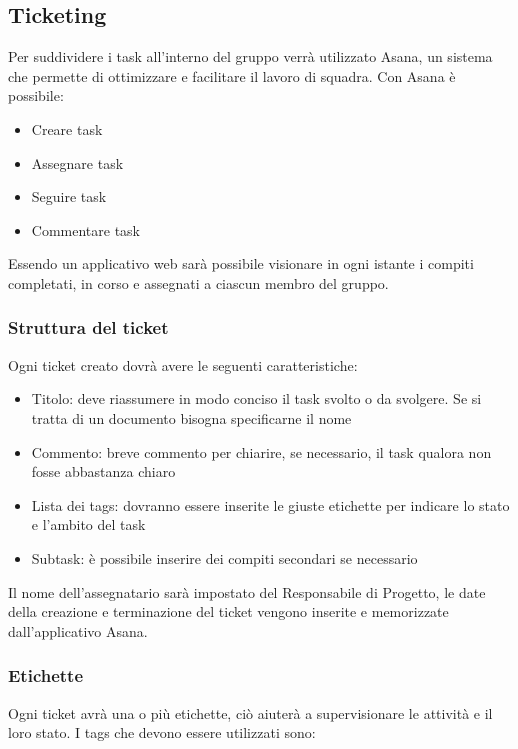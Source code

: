 \subsection{Ticketing}

Per suddividere i task all’interno del gruppo verrà utilizzato Asana, un sistema che permette di ottimizzare e facilitare il lavoro di squadra. Con Asana è possibile:
\begin{itemize}
	\item Creare task
	\item Assegnare task
	\item Seguire task 
	\item Commentare task
\end{itemize}
Essendo un applicativo web sarà possibile visionare in ogni istante i compiti completati, in corso e assegnati a ciascun membro del gruppo.


\subsubsection{Struttura del ticket}
Ogni ticket creato dovrà avere le seguenti caratteristiche:
\begin{itemize}
	\item Titolo: deve riassumere in modo conciso il task svolto o da svolgere. Se si tratta di un documento bisogna specificarne il nome
	\item Commento: breve commento per chiarire, se necessario, il task qualora non fosse abbastanza chiaro
	\item Lista dei tags: dovranno essere inserite le giuste etichette per indicare lo stato e l’ambito del task 
	\item Subtask: è possibile inserire dei compiti secondari se necessario
\end{itemize}

Il nome dell’assegnatario sarà impostato del Responsabile di Progetto, le date della creazione e terminazione del ticket vengono inserite e memorizzate dall’applicativo Asana.

\subsubsection{Etichette}

Ogni ticket avrà una o più etichette, ciò aiuterà a supervisionare le attività e il loro stato. I tags che devono essere utilizzati sono:

